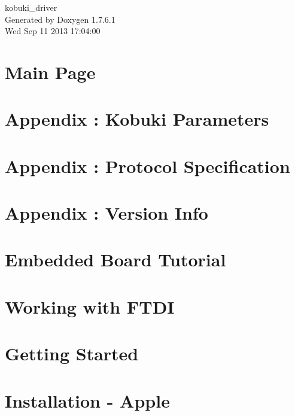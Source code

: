 \documentclass[a4paper]{book}
\begin{document}
\begin{titlepage}
\vspace*{7cm}
\begin{center}
{\Large kobuki\-\_\-driver }\\
\vspace*{1cm}
{\large \-Generated by Doxygen 1.7.6.1}\\
\vspace*{0.5cm}
{\small Wed Sep 11 2013 17:04:00}\\
\end{center}
\end{titlepage}
\clearemptydoublepage
{}
\tableofcontents
\clearemptydoublepage
{}
\chapter{\-Main \-Page}
\label{index}
\chapter{\-Appendix \-: \-Kobuki \-Parameters}
\label{enAppendixKobukiParameters}

\chapter{\-Appendix \-: \-Protocol \-Specification}
\label{enAppendixProtocolSpecification}

\chapter{\-Appendix \-: \-Version \-Info}
\label{enAppendixVersionInfo}

\chapter{\-Embedded \-Board \-Tutorial}
\label{enEmbeddedBoardTutorial}

\chapter{\-Working with \-F\-T\-D\-I}
\label{enFtdiGuide}

\chapter{\-Getting \-Started}
\label{enGettingStartedGuide}

\chapter{\-Installation -\/ \-Apple}
\label{koInstallationAppleGuide}

\end{document}
